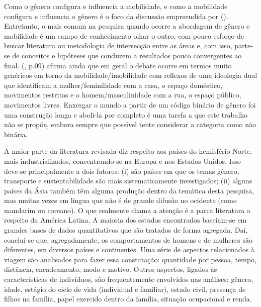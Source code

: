 
Como o gênero configura e influencia a mobilidade, e como a mobilidade configura e influencia o gênero é o foco da discussão empreendida por  (\citeyear{HANSON2010}). Entretanto, o mais comum na pesquisa quando ocorre a abordagem de gênero e mobilidade é um campo de conhecimento olhar o outro, com pouco esforço de buscar literatura ou metodologia de intersecção entre as áreas e, com isso, parte-se de conceitos e hipóteses que conduzem a resultados pouco convergentes ao final.  (\citeyear{HANSON2010}, p.09) afirma ainda que em geral o debate ocorre em termos muito genéricos em torno da mobilidade/imobilidade com reflexos de uma ideologia dual que identificam a mulher/feminilidade com a casa, o espaço doméstico, movimentos restritos e o homem/masculinidade com a rua, o espaço público, movimentos livres. Enxergar o mundo a partir de um código binário de gênero foi uma construção longa e aboli-la por completo é uma tarefa a que este trabalho não se propõe, embora sempre que possível tente considerar a categoria como não binária.

A maior parte da literatura revisada diz respeito aos países do hemisfério Norte, mais industrializados, concentrando-se na Europa e nos Estados Unidos. Isso deve-se principalmente a dois fatores: (i) são países em que os temas gênero, transporte e sustentabilidade são mais sistematicamente investigados; (ii) alguns países da Ásia também têm alguma produção dentro da temática desta pesquisa, mas muitas vezes em língua que não é de grande difusão no ocidente (como mandarim ou coreano). O que realmente chama a atenção é a parca literatura a respeito da América Latina. A maioria dos estudos encontrados baseiam-se em grandes bases de dados quantitativos que são tratados de forma agregada. Daí, conclui-se que, agregadamente, os comportamentos de homens e de mulheres são diferentes, em diversos países e continentes. Uma série de aspectos relacionados à viagem são analisados para fazer essa constatação: quantidade por pessoa, tempo, distância, encadeamento, modo e motivo. Outros aspectos, ligados às características de indivíduos, são frequentemente envolvidos nas análises: gênero, idade, estágio do ciclo de vida (individual e familiar), estado civil, presença de filhos na família, papel exercido dentro da família, situação ocupacional e renda.



